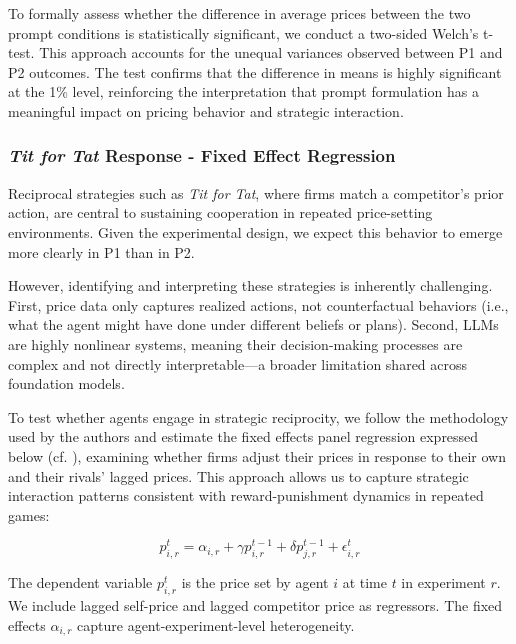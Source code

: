 To formally assess whether the difference in average prices between the two prompt conditions is statistically significant, we conduct a two-sided Welch’s t-test. This approach accounts for the unequal variances observed between P1 and P2 outcomes. The test confirms that the difference in means is highly significant at the 1\% level, reinforcing the interpretation that prompt formulation has a meaningful impact on pricing behavior and strategic interaction.

\subsubsection*{\textit{Tit for Tat} Response - Fixed Effect Regression}

Reciprocal strategies such as \textit{Tit for Tat}, where firms match a competitor's prior action, are central to sustaining cooperation in repeated price-setting environments. Given the experimental design, we expect this behavior to emerge more clearly in P1 than in P2.

However, identifying and interpreting these strategies is inherently challenging. First, price data only captures realized actions, not counterfactual behaviors (i.e., what the agent might have done under different beliefs or plans). Second, LLMs are highly nonlinear  systems, meaning their decision-making processes are complex and not directly interpretable—a broader limitation shared across foundation models.

To test whether agents engage in strategic reciprocity, we follow the methodology used by the authors \cite{fish_algorithmic_2025} and estimate the fixed effects panel regression expressed below (cf. ), examining whether firms adjust their prices in response to their own and their rivals’ lagged prices. This approach allows us to capture strategic interaction patterns consistent with reward-punishment dynamics in repeated games:

\begin{equation}\label{eq:fish_fe}
    p_{i,r}^{t} = \alpha_{i,r} + \gamma p_{i,r}^{t-1} + \delta p_{j,r}^{t-1} + \epsilon_{i,r}^t
\end{equation}

The dependent variable $p_{i,r}^{t}$ is the price set by agent $i$ at time $t$ in experiment $r$. We include lagged self-price and lagged competitor price as regressors. The fixed effects $\alpha_{i,r}$ capture agent-experiment-level heterogeneity. 

